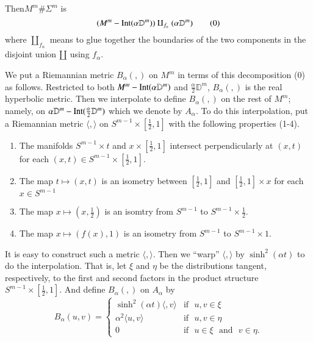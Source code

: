 Then\pageoriginale $M^{m}\# \Sigma^{m}$ is
\begin{equation*}
(M^{m}-\operatorname{Int}(\alpha\mathbb{D}^{m}))\amalg_{f_{\alpha}}(\alpha\mathbb{D}^{m})\tag{0} 
\end{equation*}
where $\amalg_{f_{\alpha}}$ means to glue together the boundaries of
the two components in the disjoint union $\amalg$ using $f_{\alpha}$.

We put a Riemannian metric $B_{\alpha}(,)$ on $M^{m}$ in terms of this
decomposition (0) as follows. Restricted to both
$M^{m}-\operatorname{Int}(\alpha\mathbb{D}^{m})$ and
$\frac{\alpha}{2}\mathbb{D}^{m}$, $B_{\alpha}(,)$ is the real
hyperbolic metric. Then we interpolate to define $B_{\alpha}(,)$ on
the rest of $M^{m}$; namely, on
$\alpha\mathbb{D}^{m}-\operatorname{Int}(\frac{\alpha}{2}\mathbb{D}^{m})$ which we
denote by $A_{\alpha}$. To do this interpolation, put a Riemannian
metric $\langle ,\rangle$ on $S^{m-1}\times [\frac{1}{2},1]$ with the
following properties (1-4).
\begin{enumerate}
\renewcommand{\labelenumi}{(\theenumi)}
\item The manifolds $S^{m-1}\times t$ and $x\times [\frac{1}{2},1]$
  intersect perpendicularly at $(x,t)$ for each $(x,t)\in
  S^{m-1}\times[\frac{1}{2},1]$.

\item The map $t\mapsto (x,t)$ is an isometry between
  $[\frac{1}{2},1]$ and $[\frac{1}{2},1]\times x$ for each $x\in
  S^{m-1}$ 

\item The map $x\mapsto (x,\frac{1}{2})$ is an isomtry from 
$S^{m-1}$ to $S^{m-1}\times \frac{1}{2}$.

\item The map $x\mapsto (f(x),1)$ is an isometry from $S^{m-1}$ to
  $S^{m-1}\times 1$.
\end{enumerate}

It is easy to construct such a metric $\langle,\rangle$. Then we
``warp'' $\langle,\rangle$ by $\sinh^{2}(\alpha t)$ to do the
interpolation. That is, let $\xi$ and $\eta$ be the distributions
tangent, respectively, to the first and second factors in the product
structure $S^{m-1}\times [\frac{1}{2},1]$. And define $B_{\alpha}(,)$
on $A_{\alpha}$ by
\begin{equation*}
B_{\alpha}(u,v)=
\begin{cases}
\sinh^{2}(\alpha t)\langle,v\rangle & \text{if~ }u,v\in \xi\\
\alpha^{2}\langle u,v\rangle & \text{if~ } u,v\in \eta\\
0 & \text{if~ } u\in \xi\text{~ and~ } v\in \eta.
\end{cases}\tag{5}\label{c17:eq5}
\end{equation*}

